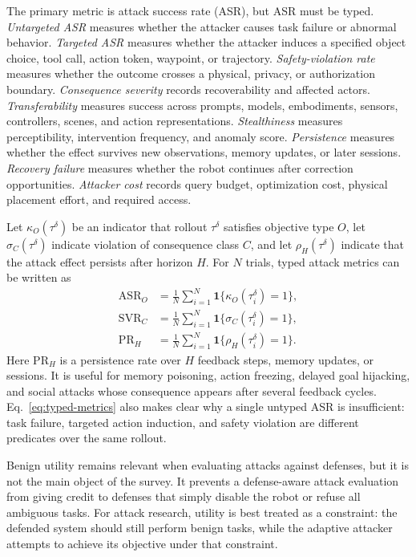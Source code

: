 The primary metric is attack success rate (ASR), but ASR must be typed. \emph{Untargeted ASR} measures whether the attacker causes task failure or abnormal behavior. \emph{Targeted ASR} measures whether the attacker induces a specified object choice, tool call, action token, waypoint, or trajectory. \emph{Safety-violation rate} measures whether the outcome crosses a physical, privacy, or authorization boundary. \emph{Consequence severity} records recoverability and affected actors. \emph{Transferability} measures success across prompts, models, embodiments, sensors, controllers, scenes, and action representations. \emph{Stealthiness} measures perceptibility, intervention frequency, and anomaly score. \emph{Persistence} measures whether the effect survives new observations, memory updates, or later sessions. \emph{Recovery failure} measures whether the robot continues after correction opportunities. \emph{Attacker cost} records query budget, optimization cost, physical placement effort, and required access.

Let $\kappa_O(\tau^\delta)$ be an indicator that rollout $\tau^\delta$ satisfies objective type $O$, let $\sigma_C(\tau^\delta)$ indicate violation of consequence class $C$, and let $\rho_H(\tau^\delta)$ indicate that the attack effect persists after horizon $H$. For $N$ trials, typed attack metrics can be written as
\begin{align}
    \mathrm{ASR}_{O} &= \frac{1}{N}\sum_{i=1}^{N}\mathbf{1}\{\kappa_O(\tau_i^\delta)=1\}, \nonumber\\
    \mathrm{SVR}_{C} &= \frac{1}{N}\sum_{i=1}^{N}\mathbf{1}\{\sigma_C(\tau_i^\delta)=1\}, \nonumber\\
    \mathrm{PR}_{H} &= \frac{1}{N}\sum_{i=1}^{N}\mathbf{1}\{\rho_H(\tau_i^\delta)=1\}.
    \label{eq:typed-metrics}
\end{align}
Here $\mathrm{PR}_{H}$ is a persistence rate over $H$ feedback steps, memory updates, or sessions. It is useful for memory poisoning, action freezing, delayed goal hijacking, and social attacks whose consequence appears after several feedback cycles. Eq.~\eqref{eq:typed-metrics} also makes clear why a single untyped ASR is insufficient: task failure, targeted action induction, and safety violation are different predicates over the same rollout.

Benign utility remains relevant when evaluating attacks against defenses, but it is not the main object of the survey. It prevents a defense-aware attack evaluation from giving credit to defenses that simply disable the robot or refuse all ambiguous tasks. For attack research, utility is best treated as a constraint: the defended system should still perform benign tasks, while the adaptive attacker attempts to achieve its objective under that constraint.

